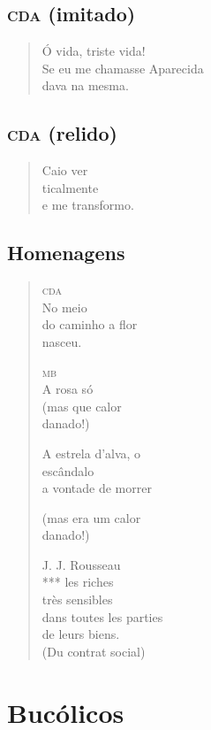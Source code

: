 \chapter{\textsc{cda} (imitado)}

\begin{verse}
Ó vida, triste vida!\\
Se eu me chamasse Aparecida\\
dava na mesma.
\end{verse}

\chapter{\textsc{cda} (relido)}

\begin{verse}
Caio ver\\
\qquad\quad ticalmente\\
\qquad\quad e me transformo.
\end{verse}

\chapter{Homenagens}

\begin{verse}
\textsc{cda}\\
No meio\\
do caminho a flor\\
nasceu.

\textsc{mb}\\
A rosa só\\
(mas que calor\\
danado!)

A estrela d'alva, o\\
escândalo\\
a vontade de morrer

(mas era um calor\\
danado!)

J. J. Rousseau\\
*** les riches\\
\qquad très sensibles\\
\qquad dans toutes les parties\\
\qquad de leurs biens.\\
\qquad (Du contrat social)
\end{verse}

\part*{Bucólicos}

